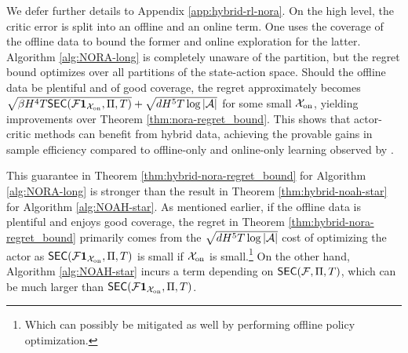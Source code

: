 We defer further details to Appendix \ref{app:hybrid-rl-nora}. On the high level, the critic error is split into an offline and an online term. One uses the coverage of the offline data to bound the former and online exploration for the latter. Algorithm \ref{alg:NORA-long} is completely unaware of the partition, but the regret bound optimizes over all partitions of the state-action space. Should the offline data be plentiful and of good coverage, the regret approximately becomes $\sqrt{\beta H^4 T \mathsf{SEC}({\mathcal{F}} \mathbf{1}_{{\mathcal{X}}_{{\operatorname{on}}}}, \Pi, T)} + \sqrt{dH^5T \log|{\mathcal{A}}|}$ for some small ${\mathcal{X}}_{{\operatorname{on}}}$, yielding improvements over Theorem \ref{thm:nora-regret_bound}.
This shows that actor-critic methods can benefit from hybrid data, achieving the provable gains in sample efficiency compared to offline-only and online-only learning observed
by \citet{li2023reward, tan2024hybrid}.


This guarantee in Theorem \ref{thm:hybrid-nora-regret_bound} for Algorithm \ref{alg:NORA-long} is stronger than the result in Theorem \ref{thm:hybrid-noah-star} for Algorithm \ref{alg:NOAH-star}. As mentioned earlier, if the offline data is plentiful and enjoys good coverage, the regret in Theorem \ref{thm:hybrid-nora-regret_bound} primarily comes from the $\sqrt{dH^5 T \log|{\mathcal{A}}|}$ cost of optimizing the actor as $\mathsf{SEC}({\mathcal{F}} \mathbf{1}_{{\mathcal{X}}_{{\operatorname{on}}}}, \Pi, T)$ is small if ${\mathcal{X}}_{{\operatorname{on}}}$ is small.\footnote{Which can possibly be mitigated as well by performing offline policy optimization.} On the other hand, Algorithm \ref{alg:NOAH-star} incurs a term depending on $\mathsf{SEC}({\mathcal{F}}, \Pi, T)$, which can be much larger than $\mathsf{SEC}({\mathcal{F}} \mathbf{1}_{{\mathcal{X}}_{{\operatorname{on}}}}, \Pi, T)$.




